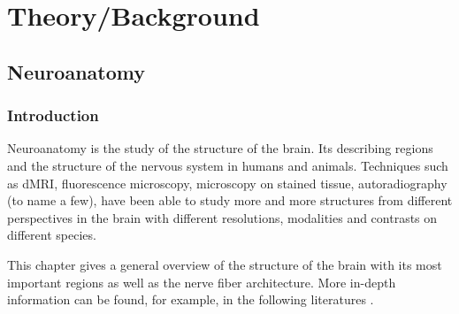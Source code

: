\newpage\null\thispagestyle{empty}\newpage
\clearpage{\thispagestyle{empty}\cleardoublepage}
\part{Theory/Background}
\parttoc
% 
% 
% 
\cleardoublepage
\setcounter{chapter}{1}
\chapter{Neuroanatomy}
\label{chap:neuro}
%
%
%
\section{Introduction}
%
Neuroanatomy is the study of the structure of the brain.
Its describing regions and the structure of the nervous system in humans and animals.
Techniques such as \ac{dMRI}, fluorescence microscopy, microscopy on stained tissue, autoradiography (to name a few), have been able to study more and more structures from different perspectives in the brain with different resolutions, modalities and contrasts on different species.
% 
\par
%
This chapter gives a general overview of the structure of the brain with its most important regions as well as the nerve fiber architecture.
More in-depth information can be found, for example, in the following literatures \dummy{}.
% 
%
% 
% 
% 
%
